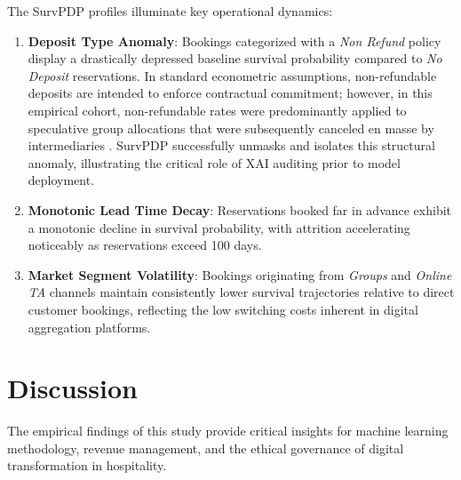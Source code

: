 \documentclass[pdflatex,iicol,sn-mathphys-ay]{sn-jnl}
\theoremstyle{thmstyleone}%
\theoremstyle{thmstyletwo}%
\theoremstyle{thmstylethree}%
\begin{document}
The SurvPDP profiles illuminate key operational dynamics:
\begin{enumerate}
    \item \textbf{Deposit Type Anomaly}: Bookings categorized with a \textit{Non Refund} policy display a drastically depressed baseline survival probability compared to \textit{No Deposit} reservations. In standard econometric assumptions, non-refundable deposits are intended to enforce contractual commitment; however, in this empirical cohort, non-refundable rates were predominantly applied to speculative group allocations that were subsequently canceled en masse by intermediaries \citep{antonio2019big}. SurvPDP successfully unmasks and isolates this structural anomaly, illustrating the critical role of XAI auditing prior to model deployment.
    \item \textbf{Monotonic Lead Time Decay}: Reservations booked far in advance exhibit a monotonic decline in survival probability, with attrition accelerating noticeably as reservations exceed 100 days.
    \item \textbf{Market Segment Volatility}: Bookings originating from \textit{Groups} and \textit{Online TA} channels maintain consistently lower survival trajectories relative to direct customer bookings, reflecting the low switching costs inherent in digital aggregation platforms.
\end{enumerate}

\section{Discussion}
\label{sec:discussion}

The empirical findings of this study provide critical insights for machine learning methodology, revenue management, and the ethical governance of digital transformation in hospitality.
\end{document}
